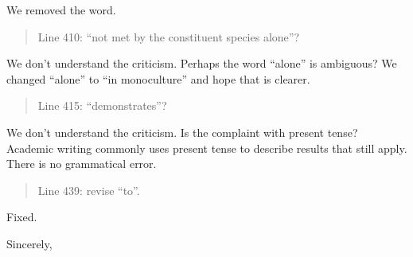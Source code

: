 \documentclass[letterpaper, 12pt]{letter}
\begin{document}
\begin{letter}{}
We removed the word.

\begin{quote}
  Line 410: “not met by the constituent species alone”?
\end{quote}

We don't understand the criticism. Perhaps the word ``alone'' is ambiguous? We
changed ``alone'' to ``in monoculture'' and hope that is clearer.

\begin{quote}
  Line 415: “demonstrates”?
\end{quote}

We don't understand the criticism. Is the complaint with present tense?
Academic writing commonly uses present tense to describe results that still
apply. There is no grammatical error.

\begin{quote}
  Line 439: revise “to”.
\end{quote}

Fixed.

\closing{Sincerely,}

\end{letter}
\end{document}

